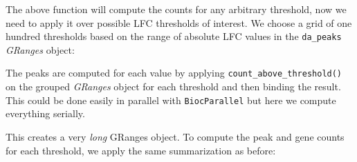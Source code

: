 \documentclass[
  9pt,
  a4paper,
]{extarticle}
\newenvironment{Shaded}{\begin{snugshade}}{\end{snugshade}}
\newcommand{\DataTypeTok}[1]{\textcolor[rgb]{0.13,0.29,0.53}{#1}}
\newcommand{\DecValTok}[1]{\textcolor[rgb]{0.00,0.00,0.81}{#1}}
\newcommand{\KeywordTok}[1]{\textcolor[rgb]{0.13,0.29,0.53}{\textbf{#1}}}
\newcommand{\NormalTok}[1]{#1}
\newcommand{\OperatorTok}[1]{\textcolor[rgb]{0.81,0.36,0.00}{\textbf{#1}}}
\newcommand{\StringTok}[1]{\textcolor[rgb]{0.31,0.60,0.02}{#1}}
\begin{document}
The above function will compute the counts for any arbitrary threshold, now we
need to apply it over possible LFC thresholds of interest. We choose a grid of
one hundred thresholds based on the range of absolute LFC values in the
\texttt{da\_peaks} \emph{GRanges} object:

\begin{Shaded}
\end{Shaded}

The peaks are computed for each value by applying \texttt{count\_above\_threshold()} on
the grouped \emph{GRanges} object for each threshold and then binding the result.
This could be done easily in parallel with \texttt{BiocParallel} but here we compute
everything serially.

\begin{Shaded}
\end{Shaded}

This creates a very \emph{long} GRanges object. To compute the peak and gene counts
for each threshold, we apply the same summarization as before:

\begin{Shaded}
\end{Shaded}
\end{document}
